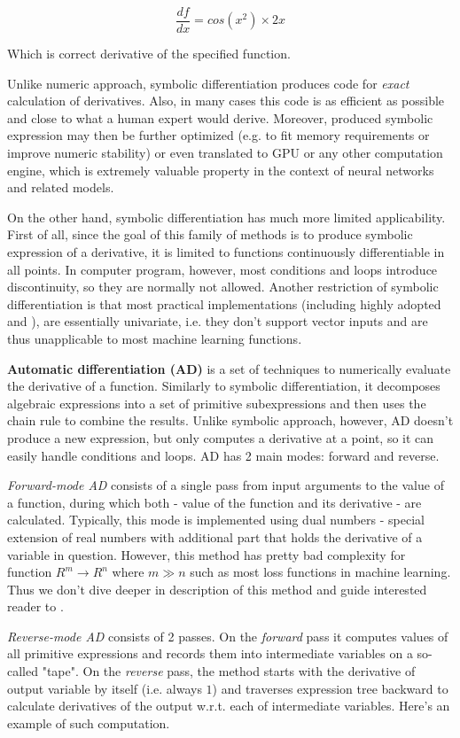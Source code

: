 \documentclass[conference]{IEEEtran}
\begin{document}
$$\frac{df}{dx} = cos(x^2) \times 2x$$

Which is correct derivative of the specified function.

Unlike numeric approach, symbolic differentiation produces code for
\textit{exact} calculation of derivatives. Also, in many cases this
code is as efficient as possible and close to what a human expert
would derive. Moreover, produced symbolic expression may then be
further optimized (e.g. to fit memory requirements or improve numeric
stability) or even translated to GPU or any other computation engine,
which is extremely valuable property in the context of neural networks
and related models.

On the other hand, symbolic differentiation has much more limited
applicability. First of all, since the goal of this family of methods
is to produce symbolic expression of a derivative, it is limited to
functions continuously differentiable in all points. In computer
program, however, most conditions and loops introduce discontinuity,
so they are normally not allowed. Another restriction of symbolic
differentiation is that most practical implementations (including
highly adopted \cite{Mathematica} and \cite{SymPy}), are essentially
univariate, i.e. they don't support vector inputs and are thus
unapplicable to most machine learning functions.

\textbf{Automatic differentiation (AD)} is a set of techniques to
numerically evaluate the derivative of a function. Similarly to
symbolic differentiation, it decomposes algebraic expressions into a
set of primitive subexpressions and then uses the chain rule to
combine the results. Unlike symbolic approach, however, AD doesn't
produce a new expression, but only computes a derivative at a point,
so it can easily handle conditions and loops. AD has 2 main modes:
forward and reverse.

\textit{Forward-mode AD} consists of a single pass from input
arguments to the value of a function, during which both - value of the
function and its derivative - are calculated. Typically, this mode is
implemented using dual numbers - special extension of real numbers
with additional part that holds the derivative of a variable in
question. However, this method has pretty bad complexity for function
$R^m \to R^n$ where $m \gg n$ such as most loss functions in machine
learning. Thus we don't dive deeper in description of this method and
guide interested reader to \cite{Stan}.

\textit{Reverse-mode AD} consists of 2 passes. On the \textit{forward}
pass it computes values of all primitive expressions and records them
into intermediate variables on a so-called "tape". On the
\textit{reverse} pass, the method starts with the derivative of output
variable by itself (i.e. always $1$) and traverses expression tree
backward to calculate derivatives of the output w.r.t. each of
intermediate variables. Here's an example of such computation.
\end{document}
